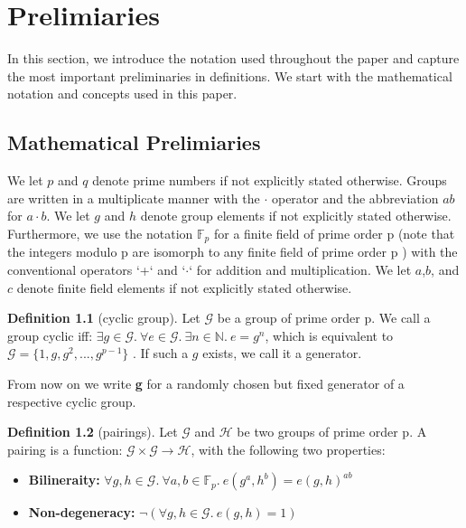 \chapter{Prelimiaries}\label{chapter:prelimiaries}

\theoremstyle{definition}
\newtheorem{definition}{Definition}[section]

\theoremstyle{remark}
\newtheorem{example}{Example}[section]

In this section, we introduce the notation used throughout the paper and capture the most important preliminaries in definitions. We start with the mathematical notation and concepts used in this paper.

\section{Mathematical Prelimiaries}

We let $p$ and $q$ denote prime numbers if not explicitly stated otherwise. 
Groups are written in a multiplicate manner with the  $\cdot$ operator and the abbreviation $ab$ for $a \cdot b$. We let $g$ and $h$ denote group elements if not explicitly stated otherwise.
Furthermore, we use the notation $\mathbb{F}_p$ for a finite field of prime order p (note that the integers modulo p are isomorph to any finite field of prime order p \parencite{algebra}) with the conventional operators `+` and `$\cdot$` for addition and multiplication. We let $a$,$b$, and $c$ denote finite field elements if not explicitly stated otherwise.

\begin{definition}[cyclic group]
Let $\mathcal{G}$ be a group of prime order p. We call a group cyclic iff: $\exists g \in \mathcal{G}. \ \forall e \in \mathcal{G}. \ \exists n \in \mathbb{N}. \ e = g^n$, which is equivalent to $\mathcal{G} = \{1,g,g^2,...,g^{p-1}\}$ \parencite{algebra}. If such a $g$ exists, we call it a generator.

From now on we write \textbf{g} for a randomly chosen but fixed generator of a respective cyclic group. 
\end{definition}

\begin{definition}[pairings]
    \label{pairings_def}
    Let $\mathcal{G}$ and $\mathcal{H}$ be two groups of prime order p. A pairing is a function: $\mathcal{G} \times \mathcal{G} \rightarrow \mathcal{H}$, with the following two properties:
    \begin{itemize}
        \item \textbf{Bilineraity:} $\forall g,h \in \mathcal{G}. \ \forall a,b \in \mathbb{F}_p. \ e(g^a,h^b) = e(g,h)^{ab}$
        \item \textbf{Non-degeneracy:} $\neg (\forall g,h \in \mathcal{G}. \ e(g,h)=1)$
    \end{itemize}
    \parencite{KZG}
\end{definition}

